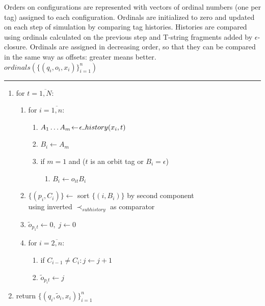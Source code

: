 \documentclass{article}
\newcommand{\Xset}{\!\leftarrow\!}
\newcommand{\Xund}{\rule{.4em}{.4pt}} %
\newcommand{\Xeq}{\!=\!}
\theoremstyle{definition}
\begin{document}
\begin{multicols}{2}
Orders on configurations are represented with vectors of ordinal numbers (one per tag) assigned to each configuration.
Ordinals are initialized to zero and updated on each step of simulation by comparing tag histories.
Histories are compared using ordinals calculated on the previous step and T-string fragments added by $\epsilon$-closure.
Ordinals are assigned in decreasing order, so that they can be compared in the same way as offsets: greater means better.
\\

    $ordinals (\{(q_i, o_i, x_i)\}_{i=1}^n)$
    \hrule
    \begin{enumerate}[leftmargin=0in]
        \smallskip
        \item[] for $t \Xeq \overline{1, N}$:
        \begin{enumerate}
            \item[] for $i \Xeq \overline{1, n}$:
            \begin{enumerate}
                \item[] $A_1 \dots A_m \Xset \epsilon \Xund history(x_i, t)$
                \item[] $B_i \Xset A_m$
                \item[] if $m \Xeq 1$ and ($t$ is an orbit tag or $B_i \Xeq \epsilon$)
                \begin{enumerate}
                    \item[] $B_i \Xset o_{i t} B_i$
                \end{enumerate}
            \end{enumerate}
            \smallskip
            \item[] $\{(p_i, C_i)\} \Xset $ sort $\{(i, B_i)\}$ by second component \\
                \hphantom{\quad} using inverted $\prec_{subhistory}$ as comparator
            \item[] $\widetilde{o}_{p_1 t} \Xset 0, \; j \Xset 0$
            \item[] for $i \Xeq \overline{2, n}$:
            \begin{enumerate}
                \item[] if $C_{i-1} \!\neq\! C_i: j \Xset j \!+\! 1$
                \item[] $\widetilde{o}_{p_i t} \Xset j$
            \end{enumerate}
        \end{enumerate}
        \smallskip
        \item[] return $\{(q_i, \widetilde{o}_i, x_i)\}_{i=1}^n$
        \\
    \end{enumerate}


\end{multicols}
\end{document}
